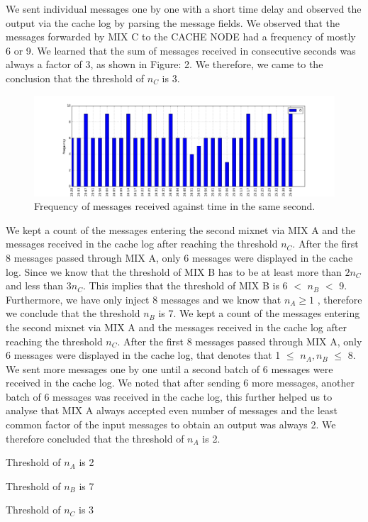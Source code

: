 \documentclass[preprint,12pt,3p]{elsarticle}
\begin{document}
We sent individual messages one by one with a short time delay and observed the output via the cache log by parsing the message fields. We observed that the messages forwarded by MIX C to the CACHE NODE had a frequency of mostly 6 or 9. We learned that the sum of messages received in consecutive seconds was always a factor of 3, as shown in Figure: 2. We therefore, we came to the conclusion that the threshold of $n_C$ is 3.
\newline
\begin{figure}[h]
\caption{Frequency of messages received against time in the same second.}
\centering
\includegraphics[width=\textwidth]{second}
\end{figure}
\newline
We kept a count of the messages entering the second mixnet via MIX A and the messages received in the cache log after reaching the threshold $n_C$. After the first 8 messages passed through MIX A, only 6 messages were displayed in the cache log. Since we know that the threshold of MIX B has to be at least more than $2n_C$ and less than $3n_C$. This implies that the threshold of MIX B is 6 $<$ $n_B$ $<$ 9. Furthermore, we have only inject 8 messages and we know that $n_A\geq 1$ , therefore we conclude that the threshold $n_B$ is 7.
\newline
We kept a count of the messages entering the second mixnet via MIX A and the messages received in the cache log after reaching the threshold $n_C$. After the first 8 messages passed through MIX A, only 6 messages were displayed in the cache log, that denotes that 1 $\leq$ $n_A, n_B$ $\leq$ 8. We sent more messages one by one until a second batch of 6 messages were received in the cache log. We noted that after sending 6 more messages, another batch of 6 messages was received in the cache log, this further helped us to analyse that MIX A always accepted even number of messages and the least common factor of the input messages to obtain an output was always 2. We therefore concluded that the threshold of $n_A$ is 2.

\begin{center}
Threshold of $n_A$ is 2

Threshold of $n_B$ is 7

Threshold of $n_C$ is 3
\end{center}
\end{document}
